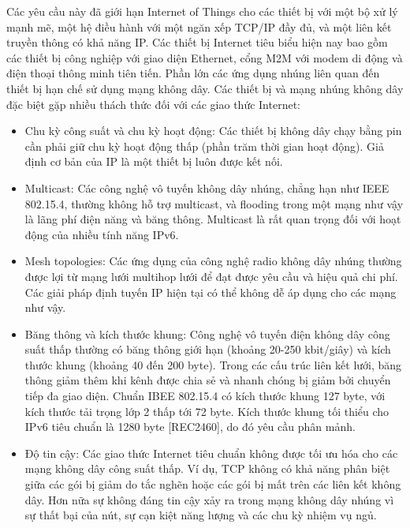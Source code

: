 \documentclass{report}
\begin{document}
Các yêu cầu này đã giới hạn Internet of Things cho các thiết bị với một bộ xử lý mạnh mẽ,
một hệ điều hành với một ngăn xếp TCP/IP đầy đủ, và một liên kết truyền thông có khả năng
IP. Các thiết bị Internet tiêu biểu hiện nay bao gồm các thiết bị công nghiệp với giao diện
Ethernet, cổng M2M với modem di động và điện thoại thông minh tiên tiến. Phần lớn các ứng
dụng nhúng liên quan đến thiết bị hạn chế sử dụng mạng không dây. Các thiết bị và mạng
nhúng không dây đặc biệt gặp nhiều thách thức đối với các giao thức Internet:
\begin{itemize}
	\item Chu kỳ công suất và chu kỳ hoạt động: Các thiết bị không dây chạy bằng pin cần phải giữ
	chu kỳ hoạt động thấp (phần trăm thời gian hoạt động). Giả định cơ bản của IP là một thiết
	bị luôn được kết nối.
	\item Multicast: Các công nghệ vô tuyến không dây nhúng, chẳng hạn như IEEE 802.15.4, thường
	không hỗ trợ multicast, và flooding trong một mạng như vậy là lãng phí điện năng và băng
	thông. Multicast là rất quan trọng đối với hoạt động của nhiều tính năng IPv6.
	\item Mesh topologies: Các ứng dụng của công nghệ radio không dây nhúng thường được lợi từ
	mạng lưới multihop lưới để đạt được yêu cầu và hiệu quả chi phí. Các giải pháp định tuyến IP
	hiện tại có thể không dễ áp dụng cho các mạng như vậy.
	\item Băng thông và kích thước khung: Công nghệ vô tuyến điện không dây công suất thấp thường
	có băng thông giới hạn (khoảng 20-250 kbit/giây) và kích thước khung (khoảng 40 đến 200
	byte). Trong các cấu trúc liên kết lưới, băng thông giảm thêm khi kênh được chia sẻ và nhanh
	chóng bị giảm bởi chuyển tiếp đa giao diện. Chuẩn IBEE 802.15.4 có kích thước khung 127
	byte, với kích thước tải trọng lớp 2 thấp tới 72 byte. Kích thước khung tối thiểu cho IPv6 tiêu
	chuẩn là 1280 byte [REC2460], do đó yêu cầu phân mảnh.
	\item Độ tin cậy: Các giao thức Internet tiêu chuẩn không được tối ưu hóa cho các mạng không dây
	công suất thấp. Ví dụ, TCP không có khả năng phân biệt giữa các gói bị giảm do tắc nghẽn
	hoặc các gói bị mất trên các liên kết không dây. Hơn nữa sự không đáng tin cậy xảy ra trong
	mạng không dây nhúng vì sự thất bại của nút, sự cạn kiệt năng lượng và các chu kỳ nhiệm vụ
	ngủ.
\end{itemize}
\end{document}
